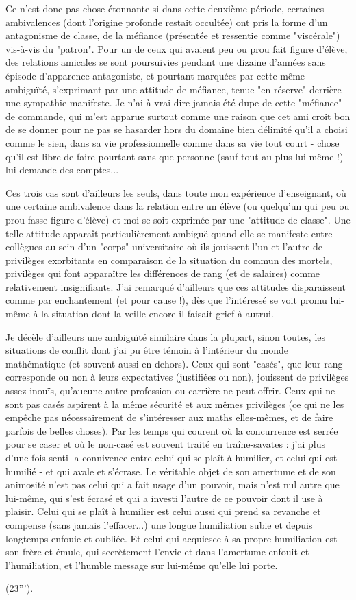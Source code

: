 {Ce n'est donc pas chose étonnante si dans cette deuxième période, certaines ambivalences (dont l'origine profonde restait occultée) ont pris la forme d'un antagonisme de classe, de la méfiance (présentée et ressentie comme "viscérale") vis-à-vis du "patron". Pour un de ceux qui avaient peu ou prou fait figure d'élève, des relations amicales se sont poursuivies pendant une dizaine d'années sans épisode d'apparence antagoniste, et pourtant marquées par cette même ambiguïté, s'exprimant par une attitude de méfiance, tenue "en réserve" derrière une sympathie manifeste. Je n'ai à vrai dire jamais été dupe de cette "méfiance" de commande, qui m'est apparue surtout comme une raison que cet ami croit bon de se donner pour ne pas se hasarder hors du domaine bien délimité qu'il a choisi comme le sien, dans sa vie professionnelle comme dans sa vie tout court - chose qu'il est libre de faire pourtant sans que personne (sauf tout au plus lui-même !) lui demande des comptes...

Ces trois cas sont d'ailleurs les seuls, dans toute mon expérience d'enseignant, où une certaine ambivalence dans la relation entre un élève (ou quelqu'un qui peu ou prou fasse figure d'élève) et moi se soit exprimée par une "attitude de classe". Une telle attitude apparaît particulièrement ambiguë quand elle se manifeste entre collègues au sein d'un "corps" universitaire où ils jouissent l'un et l'autre de privilèges exorbitants en comparaison de la situation du commun des mortels, privilèges qui font apparaître les différences de rang (et de salaires) comme relativement insignifiants. J'ai remarqué d'ailleurs que ces attitudes disparaissent comme par enchantement (et pour cause !), dès que l'intéressé se voit promu lui-même à la situation dont la veille encore il faisait grief à autrui.

Je décèle d'ailleurs une ambiguïté similaire dans la plupart, sinon toutes, les situations de conflit dont j'ai pu être témoin à l'intérieur du monde mathématique (et souvent aussi en dehors). Ceux qui sont "casés", que leur rang corresponde ou non à leurs expectatives (justifiées ou non), jouissent de privilèges assez inouïs, qu'aucune autre profession ou carrière ne peut offrir. Ceux qui ne sont pas casés aspirent à la même sécurité et aux mêmes privilèges (ce qui ne les empêche pas nécessairement de s'intéresser aux maths elles-mêmes, et de faire parfois de belles choses). Par les temps qui courent où la concurrence est serrée pour se caser et où le non-casé est souvent traité en traîne-savates : j'ai plus d'une fois senti la connivence entre celui qui se plaît à humilier, et celui qui est humilié - et qui avale et s'écrase. Le véritable objet de son amertume et de son animosité n'est pas celui qui a fait usage d'un pouvoir, mais n'est nul autre que lui-même, qui s'est écrasé et qui a investi l'autre de ce pouvoir dont il use à plaisir. Celui qui se plaît à humilier est celui aussi qui prend sa revanche et compense (sans jamais l'effacer...) une longue humiliation subie et depuis longtemps enfouie et oubliée. Et celui qui acquiesce à sa propre humiliation est son frère et émule, qui secrètement l'envie et dans l'amertume enfouit et l'humiliation, et l'humble message sur lui-même qu'elle lui porte.}(23''').

